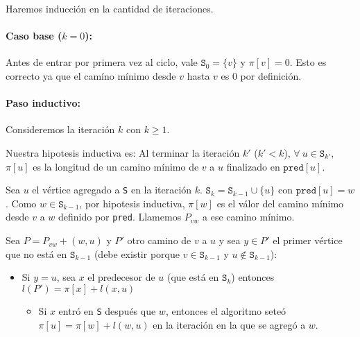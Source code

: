 \begin{demo}
  Haremos inducción en la cantidad de iteraciones.
  \paragraph{Caso base (\(k = 0\)):} Antes de entrar por primera vez al ciclo, vale \(\mathtt{S}_0 =\{v\}\) y \(\mathtt{\pi}[v] = 0\). Esto es correcto ya que el camíno mínimo desde \(v\) hasta \(v\) es 0 por definición.

  \paragraph{Paso inductivo:} Consideremos la iteración \(k\) con \(k \geq 1\).

  Nuestra hipotesis inductiva es: Al terminar la iteración  \(k'\) (\(k' < k\)), \(\forall~u\in \texttt{S}_{k'}\), \(\pi[u]\) es la longitud de un camino mínimo de \(v\) a \(u\) finalizado en \(\texttt{pred}[u]\).

  Sea \(u\) el vértice agregado a \texttt{S} en la iteración \(k\). \(\texttt{S}_{k} = \texttt{S}_{k-1}\cup \{u\}\) con \(\texttt{pred}[u] = w\). Como \(w\in\texttt{S}_{k-1}\), por hipotesis inductiva, \(\pi[w]\) es el válor del camino mínimo desde \(v\) a \(w\) definido por \texttt{pred}. Llamemos \(P_{vw}\) a ese camino mínimo.

  Sea \(P = P_{vw} + (w,u)\) y \(P'\) otro camino de \(v\) a \(u\) y sea \(y\in P'\) el primer vértice que no está en \(\texttt{S}_{k-1}\) (debe existir porque \(v\in \texttt{S}_{k-1}\) y \(u\notin\texttt{S}_{k-1}\)):
  \begin{itemize}
    \item Si \(y = u\), sea \(x\) el predecesor de \(u\) (que está en \(\texttt{S}_k\)) entonces \(l(P') = \pi[x] + l(x,u)\)
          \begin{itemize}
            \item Si \(x\) entró en \texttt{S} después que \(w\), entonces el algoritmo seteó \(\pi[u] = \pi[w] + l(w,u)\) en la iteración en la que se agregó a \(w\).
          \end{itemize}
  \end{itemize}
\end{demo}
